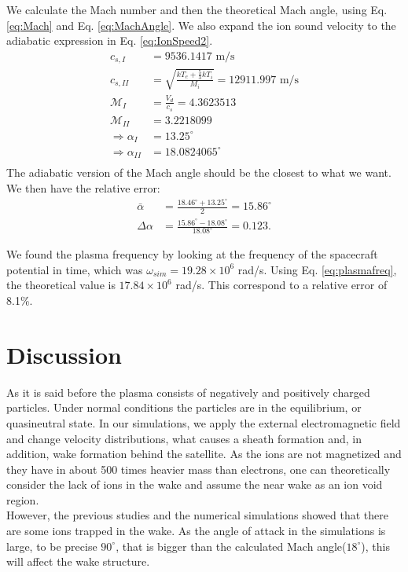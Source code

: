 \documentclass[aip, 
rsi, 
amsmath,
amssymb,
longbibliography,
preprint]{revtex4-1}
\begin{document}
We calculate the Mach number and then the theoretical Mach angle, using Eq. \ref{eq:Mach} and Eq. \ref{eq:MachAngle}. We also expand the ion sound velocity to the adiabatic expression in Eq. \ref{eq:IonSpeed2}.
\begin{align*}
c_{s,I} &= 9536.1417 \, \, \text{m/s}\\
c_{s,II} &= \sqrt{\frac{kT_e + \frac{5}{3} k T_i}{ M_i}} = 12911.997 \, \, \text{m/s}\\
\mathcal{M}_{I} &= \frac{V_d}{c_s} = 4.3623513\\
\mathcal{M}_{II} &= 3.2218099\\
\Rightarrow \alpha_{I} &= 13.25 ^{\circ}\\
\Rightarrow \alpha_{II} &= 18.0824065 ^{\circ}\\
\end{align*}
The adiabatic version of the Mach angle should be the closest to what we want. We then have the relative error:
\begin{align*}
\bar{\alpha} &= \frac{18.46^{\circ} + 13.25^{\circ}}{2} = 15.86^{\circ}\\
\Delta \alpha &= \frac{15.86 ^{\circ}- 18.08^{\circ}}{18.08^{\circ}} = 0.123.
\end{align*}

We found the plasma frequency by looking at the frequency of the spacecraft potential in time, which was $\omega_{sim} = 19.28\times 10^{6}$ rad/s. Using Eq. \ref{eq:plasmafreq}, the theoretical value is $17.84\times 10^{6}$ rad/s. This correspond to a relative error of 8.1\%.

\section{Discussion}

As it is said before the plasma consists of negatively and positively charged particles. Under normal conditions the particles are in the equilibrium, or quasineutral state. In our simulations, we apply the external electromagnetic field and change velocity distributions, what causes a sheath formation and, in addition, wake formation behind the satellite. As the ions are not magnetized and they have in about 500 times heavier mass than electrons, one can theoretically consider the lack of ions in the wake and assume the near wake as an ion void region.\\

However, the previous studies \cite{P1} and the numerical simulations showed that there are some ions trapped in the wake. As the angle of attack in the simulations is large, to be precise $90^{\circ}$, that is bigger than the calculated Mach angle($18^{\circ}$), this will affect the wake structure.\\
\end{document}

